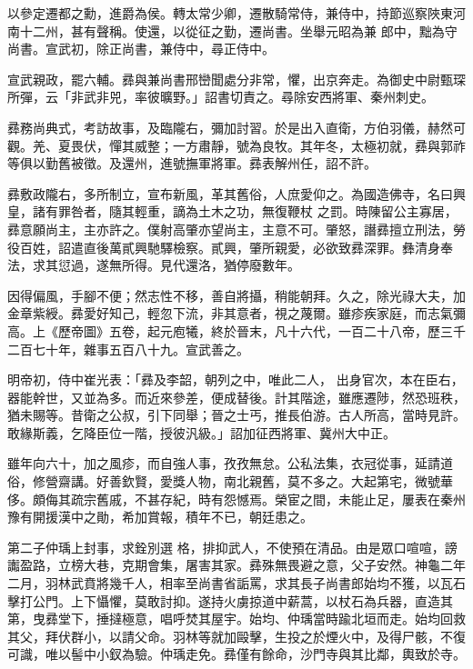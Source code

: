 \begin{pinyinscope}
 以參定遷都之勳，進爵為侯。轉太常少卿，遷散騎常侍，兼侍中，持節巡察陜東河南十二州，甚有聲稱。使還，以從征之勤，遷尚書。坐舉元昭為兼
 郎中，黜為守尚書。宣武初，除正尚書，兼侍中，尋正侍中。



 宣武親政，罷六輔。彞與兼尚書邢巒聞處分非常，懼，出京奔走。為御史中尉甄琛所彈，云「非武非兕，率彼曠野。」詔書切責之。尋除安西將軍、秦州刺史。



 彞務尚典式，考訪故事，及臨隴右，彌加討習。於是出入直衛，方伯羽儀，赫然可觀。羌、夏畏伏，憚其威整；一方肅靜，號為良牧。其年冬，太極初就，彞與郭祚等俱以勤舊被徵。及還州，進號撫軍將軍。彞表解州任，詔不許。



 彞敷政隴右，多所制立，宣布新風，革其舊俗，人庶愛仰之。為國造佛寺，名曰興皇，諸有罪咎者，隨其輕重，謫為土木之功，無復鞭杖
 之罰。時陳留公主寡居，彞意願尚主，主亦許之。僕射高肇亦望尚主，主意不可。肇怒，譖彞擅立刑法，勞役百姓，詔遣直後萬貳興馳驛檢察。貳興，肇所親愛，必欲致彞深罪。彝清身奉法，求其愆過，遂無所得。見代還洛，猶停廢數年。



 因得偏風，手腳不便；然志性不移，善自將攝，稍能朝拜。久之，除光祿大夫，加金章紫綬。彞愛好知己，輕忽下流，非其意者，視之蔑爾。雖疹疾家庭，而志氣彌高。上《歷帝圖》五卷，起元庖犧，終於晉末，凡十六代，一百二十八帝，歷三千二百七十年，雜事五百八十九。宣武善之。



 明帝初，侍中崔光表：「彞及李韶，朝列之中，唯此二人，
 出身官次，本在臣右，器能幹世，又並為多。而近來參差，便成替後。計其階途，雖應遷陟，然恐班秩，猶未賜等。昔衛之公叔，引下同舉；晉之士丐，推長伯游。古人所高，當時見許。敢緣斯義，乞降臣位一階，授彼汎級。」詔加征西將軍、冀州大中正。



 雖年向六十，加之風疹，而自強人事，孜孜無怠。公私法集，衣冠從事，延請道俗，修營齋講。好善欽賢，愛獎人物，南北親舊，莫不多之。大起第宅，微號華侈。頗侮其疏宗舊戚，不甚存紀，時有怨憾焉。榮宦之間，未能止足，屢表在秦州豫有開援漢中之勛，希加賞報，積年不已，朝廷患之。



 第二子仲瑀上封事，求銓別選
 格，排抑武人，不使預在清品。由是眾口喧喧，謗讟盈路，立榜大巷，克期會集，屠害其家。彞殊無畏避之意，父子安然。神龜二年二月，羽林武賁將幾千人，相率至尚書省詬罵，求其長子尚書郎始均不獲，以瓦石擊打公門。上下懾懼，莫敢討抑。遂持火虜掠道中薪蒿，以杖石為兵器，直造其第，曳彞堂下，捶撻極意，唱呼焚其屋宇。始均、仲瑀當時踰北垣而走。始均回救其父，拜伏群小，以請父命。羽林等就加毆擊，生投之於煙火中，及得尸骸，不復可識，唯以髻中小釵為驗。仲瑀走免。彞僅有餘命，沙門寺與其比鄰，輿致於寺。




\end{pinyinscope}
